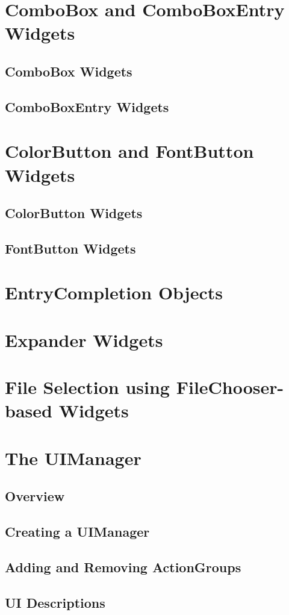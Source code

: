\section{ComboBox and ComboBoxEntry Widgets}
	\subsection{ComboBox Widgets}
	\subsection{ComboBoxEntry Widgets}
\section{ColorButton and FontButton Widgets}
	\subsection{ColorButton Widgets}
	\subsection{FontButton Widgets}
\section{EntryCompletion Objects}
\section{Expander Widgets}
\section{File Selection using FileChooser-based Widgets}
\section{The UIManager}
	\subsection{Overview}
	\subsection{Creating a UIManager}
	\subsection{Adding and Removing ActionGroups}
	\subsection{UI Descriptions}
